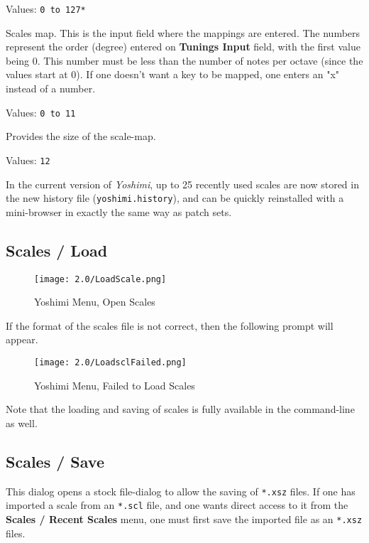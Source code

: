    Values: \texttt{0 to 127*}

   Scales map.  This is the input field where the mappings are entered.
   The numbers represent the order (degree) entered on
   \textbf{Tunings Input} field, with the first value being 0.
   This number must be less than the number of notes per octave (since
   the values start at 0).
   If one doesn't want a key to be mapped, one enters an "x" instead of a
   number.

   Values: \texttt{0 to 11}

   Provides the size of the scale-map.

   Values: \texttt{12}

   In the current version of \textsl{Yoshimi}, up to 25 recently used scales are
   now stored in the new history file
   (\texttt{yoshimi.history}), and can be quickly reinstalled with a
   mini-browser in exactly the same way as patch sets.

\subsection{Scales / Load}
\label{subsec:scales_load}

\begin{figure}[H]
   \centering
   \texttt{[image: 2.0/LoadScale.png]}
   \caption{Yoshimi Menu, Open Scales}
   \label{fig:yoshimi_open_scales}
\end{figure}

   If the format of the scales file is not correct, then the following prompt
   will appear.

\begin{figure}[H]
   \centering
   \texttt{[image: 2.0/LoadsclFailed.png]}
   \caption{Yoshimi Menu, Failed to Load Scales}
   \label{fig:yoshimi_failed_to_load_scales}
\end{figure}

   Note that the loading and saving of scales is fully available in the
   command-line as well.

\subsection{Scales / Save}
\label{subsec:scales_save}

   This dialog opens a stock file-dialog to allow the saving of
   \texttt{*.xsz} files.
   If one has imported a scale from an \texttt{*.scl} file, and one
   wants direct access to it from the \textbf{Scales / Recent Scales} menu, one
   must first save the imported file as an \texttt{*.xsz} files.


